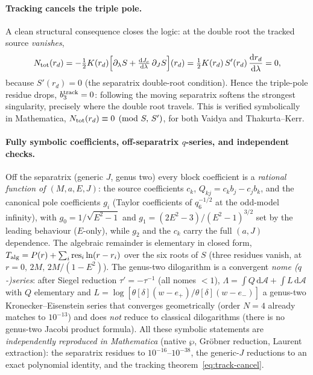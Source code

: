 \documentclass[12pt]{iopart}
\newcommand{\Jc}{J_{c}}
\newcommand{\dd}{\mathrm{d}}
\begin{document}
\paragraph{Tracking cancels the triple pole.}
A clean structural consequence closes the logic: at the double root the tracked
source \emph{vanishes},
\begin{equation}
N_{\rm tot}(r_d)=-\tfrac12K(r_d)\Big[\partial_\lambda S
+\tfrac{\dd\Jc}{\dd\lambda}\,\partial_JS\Big](r_d)
=\tfrac12K(r_d)\,S'(r_d)\,\frac{\dd r_d}{\dd\lambda}=0,
\label{eq:track-cancel}
\end{equation}
because $S'(r_d)=0$ (the separatrix double-root condition). Hence the triple-pole
residue drops, $b_3^{\rm track}=0$: following the moving separatrix softens the
strongest singularity, precisely where the double root travels. This is verified
symbolically in Mathematica, $N_{\rm tot}(r_d)\equiv0\pmod{S,\,S'}$, for both Vaidya
and Thakurta--Kerr.

\paragraph{Fully symbolic coefficients, off-separatrix $q$-series, and independent checks.}
Off the separatrix (generic $J$, genus two) every block coefficient is a
\emph{rational function of $(M,a,E,J)$}: the source coefficients $c_k$,
$Q_{kj}=c_kb_j-c_jb_k$, and the canonical pole coefficients $g_i$ (Taylor
coefficients of $q_6^{-1/2}$ at the odd-model infinity), with
$g_0=1/\sqrt{E^2-1}$ and $g_1=(2E^2-3)/(E^2-1)^{3/2}$ set by the leading behaviour
($E$-only), while $g_2$ and the $c_k$ carry the full $(a,J)$ dependence. The
algebraic remainder is elementary in closed form,
$T_{\rm alg}=P(r)+\sum_i\mathrm{res}_i\ln(r-r_i)$ over the six roots of $S$
(three residues vanish, at $r=0,\,2M,\,2M/(1-E^2)$). The genus-two dilogarithm is a
convergent \emph{nome ($q$-)series}: after Siegel reduction $\tau'=-\tau^{-1}$ (all
nomes ${<}1$), $\Lambda=\int Q\,\dd\mathcal A+\int L\,\dd\mathcal A$ with $Q$
elementary and $L=\log[\theta[\delta](w-e_+)/\theta[\delta](w-e_-)]$ a genus-two
Kronecker--Eisenstein series that converges geometrically (order $N{=}4$ already
matches to $10^{-13}$) and does \emph{not} reduce to classical dilogarithms (there is
no genus-two Jacobi product formula). All these symbolic statements are
\emph{independently reproduced in Mathematica} (native $\wp$, Gröbner reduction,
Laurent extraction): the separatrix residues to $10^{-16}$--$10^{-38}$, the generic-$J$
reductions to an exact polynomial identity, and the tracking
theorem~\eqref{eq:track-cancel}.
\end{document}
